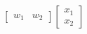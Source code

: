 \documentclass[preview]{standalone}
\begin{document}
\begin{align*}
\begin{bmatrix} w_1 & w_2 \end{bmatrix} \begin{bmatrix} x_1 \\ x_2 \end{bmatrix}
\end{align*}
\end{document}
